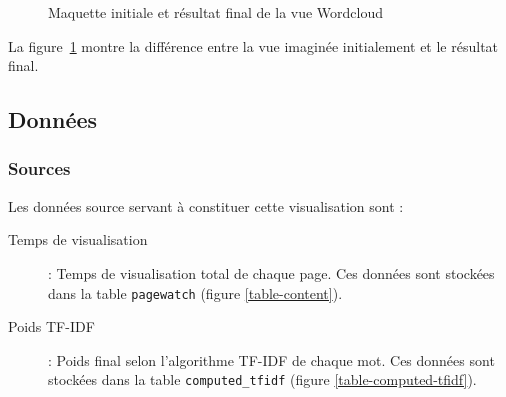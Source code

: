 		\begin{figure}[!h]
			\centering
			\caption{Maquette initiale et résultat final de la vue Wordcloud}
			\label{wordcloud_images}
		\end{figure}

		La figure~\ref{wordcloud_images} montre la différence entre la vue imaginée initialement et le résultat final.

	\subsection{Données}

		\subsubsection{Sources}

			Les données source servant à constituer cette visualisation sont :
			\begin{description}
				\item[Temps de visualisation] : Temps de visualisation total de chaque page. Ces données sont stockées dans la table \texttt{pagewatch} (figure \ref{table-content}).
				\item[Poids TF-IDF] : Poids final selon l'algorithme TF-IDF de chaque mot. Ces données sont stockées dans la table \texttt{computed\_tfidf} (figure \ref{table-computed-tfidf}).
			\end{description}
